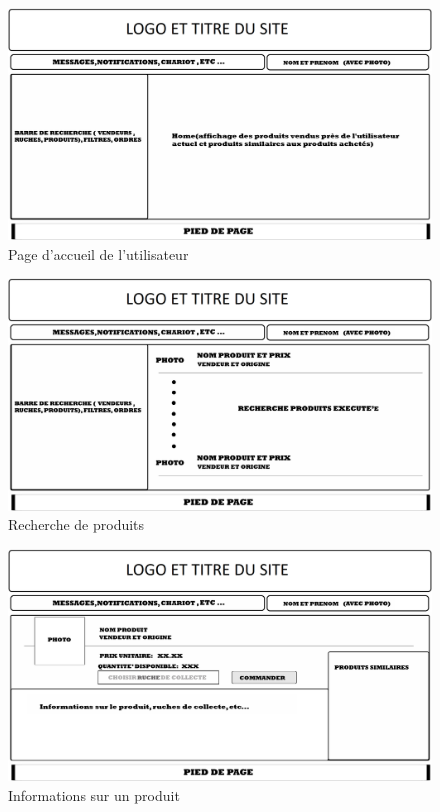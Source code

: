 \documentclass[a4paper,12pt]{report}
\theoremstyle{break}
\theoremstyle{break}
\theoremstyle{break}
\theoremstyle{break}
\theoremstyle{definition}
\theoremstyle{remark}
\begin{document}
\begin{appendices}
\begin{figure}[!ht]
  \centering
  \includegraphics[scale=0.25]{images/storyboard/02.jpg}
  \caption{Page d'accueil de l'utilisateur}
\end{figure}

\begin{figure}[!ht]
  \centering
  \includegraphics[scale=0.25]{images/storyboard/03.jpg}
  \caption{Recherche de produits}
\end{figure}

\begin{figure}[!ht]
  \centering
  \includegraphics[scale=0.25]{images/storyboard/04.jpg}
  \caption{Informations sur un produit}
\end{figure}


\end{appendices}
\end{document}
